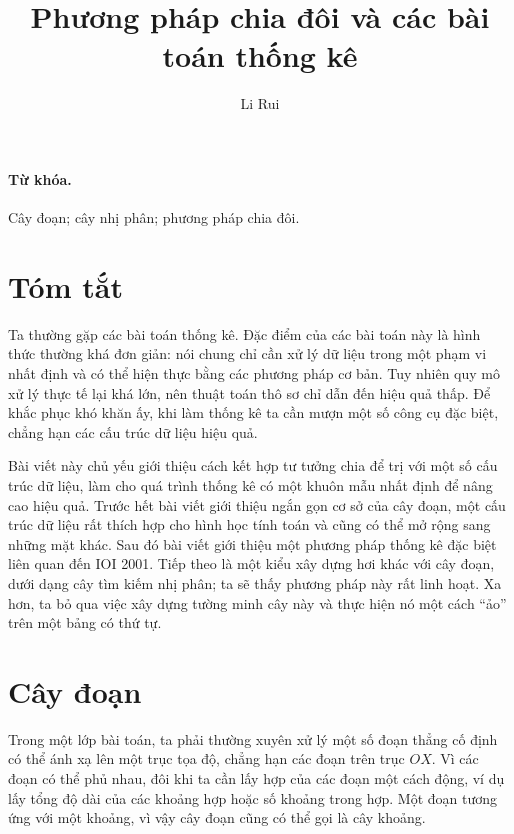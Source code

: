 \documentclass[11pt]{article}
\title{Phương pháp chia đôi và các bài toán thống kê}
\author{Li Rui}
\date{}
\begin{document}
\maketitle


\renewcommand{\contentsname}{Mục lục}
\tableofcontents

\paragraph{Từ khóa.}
Cây đoạn; cây nhị phân; phương pháp chia đôi.

\section*{Tóm tắt}

Ta thường gặp các bài toán thống kê. Đặc điểm của các bài toán này là hình
thức thường khá đơn giản: nói chung chỉ cần xử lý dữ liệu trong một phạm vi
nhất định và có thể hiện thực bằng các phương pháp cơ bản. Tuy nhiên quy mô
xử lý thực tế lại khá lớn, nên thuật toán thô sơ chỉ dẫn đến hiệu quả thấp.
Để khắc phục khó khăn ấy, khi làm thống kê ta cần mượn một số công cụ đặc
biệt, chẳng hạn các cấu trúc dữ liệu hiệu quả.

Bài viết này chủ yếu giới thiệu cách kết hợp tư tưởng chia để trị với một số
cấu trúc dữ liệu, làm cho quá trình thống kê có một khuôn mẫu nhất định để
nâng cao hiệu quả. Trước hết bài viết giới thiệu ngắn gọn cơ sở của cây
đoạn, một cấu trúc dữ liệu rất thích hợp cho hình học tính toán và cũng có
thể mở rộng sang những mặt khác. Sau đó bài viết giới thiệu một phương pháp
thống kê đặc biệt liên quan đến IOI 2001. Tiếp theo là một kiểu xây dựng hơi
khác với cây đoạn, dưới dạng cây tìm kiếm nhị phân; ta sẽ thấy phương pháp
này rất linh hoạt. Xa hơn, ta bỏ qua việc xây dựng tường minh cây này và thực
hiện nó một cách ``ảo'' trên một bảng có thứ tự.

\section{Cây đoạn}

Trong một lớp bài toán, ta phải thường xuyên xử lý một số đoạn thẳng cố định
có thể ánh xạ lên một trục tọa độ, chẳng hạn các đoạn trên trục \(OX\). Vì
các đoạn có thể phủ nhau, đôi khi ta cần lấy hợp của các đoạn một cách động,
ví dụ lấy tổng độ dài của các khoảng hợp hoặc số khoảng trong hợp. Một đoạn
tương ứng với một khoảng, vì vậy cây đoạn cũng có thể gọi là cây khoảng.
\end{document}
